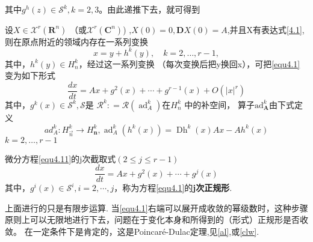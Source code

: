 其中$g ^ { h } ( z ) \in \mathscr { S } ^ { k } , k = 2,3$。由此递推下去，就可得到

\begin{theorem}
  设$X \in \mathscr { X } ^ { r } \left( \mathbf { R } ^ { n } \right)$
  （或$\mathscr { X } ^ { r } \left( \mathbf { C } ^ { n } \right) $) ,$ X ( 0 ) = 0 , \mathbf { D } X ( 0 )=A$,并且X有表达式\ref{4.1},则在原点附近的领域内存在一系列变换
  \begin{equation}
x = y + h ^ { k } ( y ) , \quad k = 2 , \dots , r - 1,
    \label{eq:1.4.10}
  \end{equation}
  其中，$h ^ { k } ( y ) \in H _ { n } ^ { k }$，经过这一系列变换
  （每次变换后把y换回x），可把\ref{equ4.1}变为如下形式
  \begin{equation}
\frac { d x } { d t } = A x + g ^ { 2 } ( x ) + \cdots + g ^ { r - 1 } ( x ) + O \left( | x | ^ { r } \right)
    \label{eq:1.4.11}
  \end{equation}
  其中，$g ^ { k } ( x ) \in \mathscr { S } ^ { k } , \mathscr { S }$是
  $\mathscr { R } ^ { k  }: = \mathscr { R } \left( \operatorname { ad } _ { A } ^ { k } \right)$在\(H_n^k\) 中的补空间，
  算子$\mathrm { ad } _ { \boldsymbol { A } } ^ { k }$由下式定义
  \begin{equation}
        \label{eq:1.4.12}
    a d _ { A } ^ { k }:H _ { \vec { n } } ^ { k } \rightarrow H _ { \mathbf { n } } ^ { k },
    \operatorname { ad } _ { A } ^ { k } \left( h ^ { k } ( x ) \right) = \operatorname { Dh } ^ { k } ( x ) A x - A h ^ { k } ( x )
  \end{equation}
  $k = 2 , \dots , r - 1$
\end{theorem}

\begin{defination}
  微分方程\ref{equ4.11}的j次截取式$( 2 \leqslant j \leqslant r - 1 )$
  \begin{equation}
\frac { d x } { d t } = A x + g ^ { 2 } ( x ) + \cdots + g ^ { j } ( x )
    \label{eq:1.4.13}
  \end{equation}
  其中，$g ^ { i } ( x ) \in \mathscr{S} ^ { i } , i = 2 , \cdots , j$，称为方程\ref{equ4.1}的\textbf{j次正规形}.
\end{defination}

\begin{corollary}
    \label{corollary:1.4.3}
  上面进行的只是有限步运算.
  当\ref{equ4.1}右端可以展开成收敛的幂级数时，这种步骤原则上可以无限地进行下去，问题在于变化本身和所得到的（形式）正规形是否收敛。
  在一定条件下是肯定的，这是Poincaré-Dulac定理,见\ref{al},或\ref{clw}.
\end{corollary}
